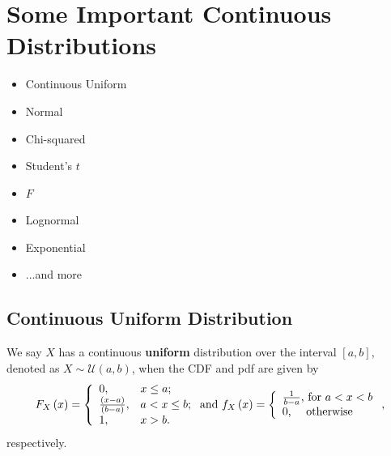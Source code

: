 \documentclass[notes=show,smaller,handout]{beamer}\usepackage[]{graphicx}\usepackage[]{color}
\begin{document}
\section{Some Important Continuous Distributions}

\begin{frame}{\secname}

\begin{itemize}
  \item Continuous Uniform
  \item Normal
  \item Chi-squared
  \item Student's $t$
  \item $F$
  \item Lognormal
  \item Exponential
  \item ...and more
  \end{itemize}
\end{frame}%

\subsection{Continuous Uniform Distribution}

\begin{frame}{\subsecname}

\begin{definition}
We say $X$ has a continuous \textbf{uniform} distribution over the
interval $[a,b]$, denoted as $X\sim \mathcal{U}(a,b)$, when the CDF and pdf are
given by
$$
{F_X\left( x\right)}=\left\{
                           \begin{array}{ll}
                             0, & \hbox{$x\leq a$;} \\
                             \frac{(x-a)}{(b-a)}, & \hbox{$a<x\leq b$;} \\
                             1, & \hbox{$x>b$.}
                           \end{array}
                         \right.\mbox{\color{black}and}~{f_{X}\left( x\right)} =\left\{
\begin{array}{l}
\frac{1}{b-a}\text{, for }a<x<b \\
0\text{, \quad otherwise}%
\end{array}%
\right. ,
$$
respectively.
\end{definition}
\end{frame}%
\end{document}
